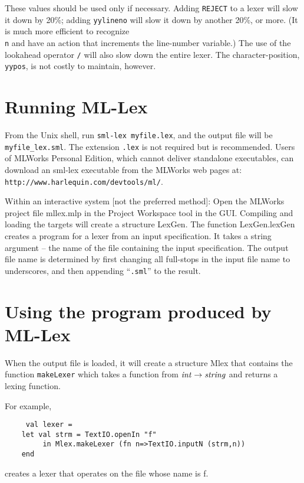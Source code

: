 \documentclass{article}
\begin{document}
These values should be used only if necessary.  Adding {\tt REJECT} to a
lexer will slow it down by 20\%; adding {\tt yylineno} will slow it down by
another 20\%, or more.  (It is much more efficient to 
recognize {\tt \\n} and
have an action that increments the line-number variable.)  The use of
the lookahead operator {\tt /} will also slow down the entire lexer.
The character-position, {\tt yypos}, is not costly to maintain, however.

\section{Running ML-Lex}

From the Unix shell, run {\tt sml-lex~myfile.lex}, and the
output file will be \verb+myfile_lex.sml+.  The extension \verb+.lex+
is not required but is recommended.  Users of MLWorks Personal Edition,
which cannot deliver standalone executables, can download an sml-lex
executable from the MLWorks web pages at: {\tt http://www.harlequin.com/devtools/ml/}.

Within an interactive system [not the preferred method]:
Open the MLWorks project file mllex.mlp in the Project
Workspace tool in the GUI.  Compiling and loading the targets
will create a structure LexGen.  The function LexGen.lexGen creates
a program for a lexer from an input specification.  It takes a string
argument -- the name of the file containing the input specification.
The output file name is determined by first changing all full-stops in
the input file name to underscores, and then appending ``{\tt .sml}''
to the result.

\section{Using the program produced by ML-Lex}

When the output file is loaded, it will create a structure Mlex that
contains the function {\tt makeLexer} which takes a function from
${\it int} \rightarrow {\it string}$ and returns a lexing function.

For example,

\begin{verbatim}
     val lexer = 
	let val strm = TextIO.openIn "f"
         in Mlex.makeLexer (fn n=>TextIO.inputN (strm,n))
	end
\end{verbatim}

creates a lexer that operates on the file whose name is f.
\end{document}
